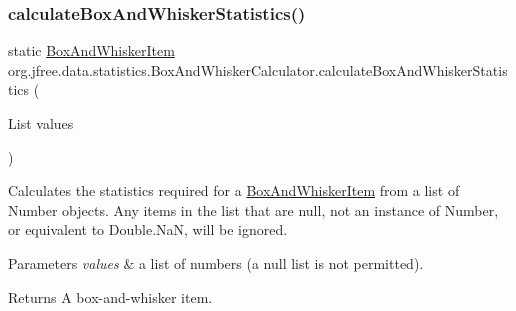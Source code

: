 \subsubsection{\texorpdfstring{calculate\+Box\+And\+Whisker\+Statistics()}{calculateBoxAndWhiskerStatistics()}\hspace{0.1cm}{\footnotesize\ttfamily [1/2]}}
{\footnotesize\ttfamily static \mbox{\hyperlink{classorg_1_1jfree_1_1data_1_1statistics_1_1_box_and_whisker_item}{Box\+And\+Whisker\+Item}} org.\+jfree.\+data.\+statistics.\+Box\+And\+Whisker\+Calculator.\+calculate\+Box\+And\+Whisker\+Statistics (\begin{DoxyParamCaption}\item[{List}]{values }\end{DoxyParamCaption})\hspace{0.3cm}{\ttfamily [static]}}

Calculates the statistics required for a \mbox{\hyperlink{classorg_1_1jfree_1_1data_1_1statistics_1_1_box_and_whisker_item}{Box\+And\+Whisker\+Item}} from a list of {\ttfamily Number} objects. Any items in the list that are {\ttfamily null}, not an instance of {\ttfamily Number}, or equivalent to {\ttfamily Double.\+NaN}, will be ignored.


\begin{DoxyParams}{Parameters}
{\em values} & a list of numbers (a {\ttfamily null} list is not permitted).\\
\hline
\end{DoxyParams}
\begin{DoxyReturn}{Returns}
A box-\/and-\/whisker item. 
\end{DoxyReturn}
\mbox{\label{classorg_1_1jfree_1_1data_1_1statistics_1_1_box_and_whisker_calculator_aac9bd67c9bd6f5ff2c79e226254f9e63}} 
